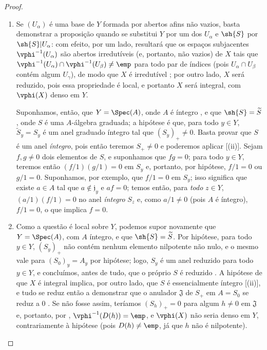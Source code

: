 \documentclass[oneside,10pt]{amsart}
\newcommand{\oldpage}[2][]{\marginnote{\normalfont\footnotesize\textbf{#1}~|~#2}\ignorespaces}
\begin{document}
\begin{proof}
\medskip\noindent
\begin{enumerate}
  \item[(i)] Se $(U_\alpha)$ é uma base de $Y$ formada por abertos afins não vazios, basta demonstrar a proposição quando se substitui $Y$ por um dos $U_\alpha$ e $\sh{S}$ por $\sh{S}|U_\alpha$:
    com efeito, por um lado, resultará que os espaços subjacentes $\vphi^{-1}(U_\alpha)$ são abertos irredutíveis (e, portanto, não vazios) de $X$ tais que $\vphi^{-1}(U_\alpha)\cap\vphi^{-1}(U_\beta)\neq\emp$ para todo par de índices (pois $U_\alpha\cap U_\beta$ contém algum $U_\gamma$), de modo que $X$ é irredutível ;
    por outro lado, $X$ será reduzido, pois essa propriedade é local, e portanto $X$ será integral, com $\vphi(X)$ denso em $Y$.

    Suponhamos, então, que $Y=\Spec(A)$, onde $A$ é íntegro , e que $\sh{S}=\widetilde{S}$, onde $S$ é uma $A$-álgebra graduada;
    a hipótese é que, para todo $y\in Y$, $\widetilde{S}_y=S_y$ é um anel graduado íntegro tal que $(S_y)_+\neq0$.
    Basta provar que $S$ é um anel \emph{íntegro}, pois então teremos $S_+\neq0$ e poderemos aplicar [(ii)].
    Sejam $f,g\neq0$ dois elementos de $S$, e suponhamos que $fg=0$;
    para todo $y\in Y$, teremos então $(f/1)(g/1)=0$ em $S_y$ e, portanto, por hipótese, $f/1=0$ ou $g/1=0$.
    Suponhamos, por exemplo, que $f/1=0$ em $S_y$;
    isso significa que existe $a\in A$ tal que $a\notin\mathfrak{j}_y$ e $af=0$;
    temos então, para \emph{todo} $z\in Y$, $(a/1)(f/1)=0$ no anel \emph{íntegro} $S_z$ e, como $a/1\neq0$ (pois $A$ é íntegro), $f/1=0$, o que implica $f=0$.
  \item[(ii)] Como a questão é local sobre $Y$, podemos supor novamente que $Y=\Spec(A)$, com $A$ íntegro, e que $\sh{S}=\widetilde{S}$.
    Por hipótese, para todo $y\in Y$, $(S_y)_+$ não contém nenhum elemento nilpotente não nulo, e o mesmo vale para $(S_0)_y=A_y$ por hipótese;
    logo, $S_y$ é um anel reduzido para todo $y\in Y$, e concluímos, antes de tudo, que o próprio $S$ é reduzido .
    A hipótese de que $X$ é integral implica, por outro lado, que $S$ é essencialmente íntegro [(ii)], e tudo se reduz então a demonstrar que o anulador $\mathfrak{J}$ de $S_+$ em $A=S_0$ se reduz
\oldpage[II]{54}
a $0$ .
Se não fosse assim, teríamos $(S_h)_+=0$ para algum $h\neq0$ em $\mathfrak{J}$ e, portanto, por , $\vphi^{-1}(D(h))=\emp$, e $\vphi(X)$ não seria denso em $Y$, contrariamente à hipótese (pois $D(h)\neq\emp$, já que $h$ não é nilpotente).
\end{enumerate}
\end{proof}
\end{document}
